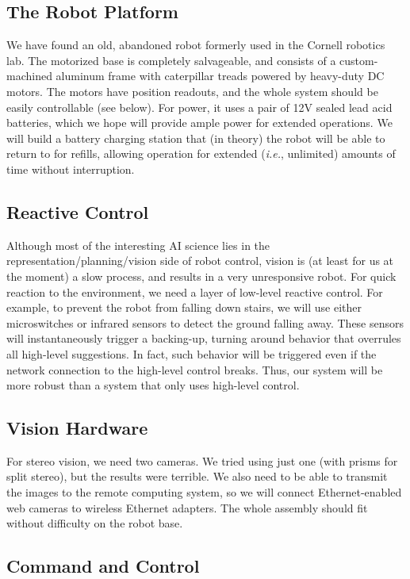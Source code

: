 \documentclass[12pt]{article}
\begin{document}
\subsection{The Robot Platform}

We have found an old, abandoned robot formerly used in the Cornell robotics
lab. The motorized base is completely salvageable, and consists of a custom-machined
aluminum frame with caterpillar treads powered by heavy-duty DC motors. The
motors have position readouts, and the whole system should be easily controllable
(see below). For power, it uses a pair of 12V sealed lead acid batteries, which
we hope will provide ample power for extended operations. We will build a battery
charging station that (in theory) the robot will be able to return to for refills,
allowing operation for extended ({\it i.e.}, unlimited) amounts of time without interruption.


\subsection{Reactive Control}

Although most of the interesting AI science lies in the representation/planning/vision
side of robot control, vision is (at least for us at the moment) a slow process,
and results in a very unresponsive robot. For quick reaction to the environment,
we need a layer of low-level reactive control. For example, to prevent the robot from
falling down stairs, we will use either microswitches or infrared sensors to
detect the ground falling away.  These sensors will instantaneously trigger a backing-up, turning
around behavior that overrules all high-level suggestions.  In fact, such behavior will be triggered even if the network connection to the high-level control breaks.  Thus, our system will be more robust than a system that only uses high-level control.


\subsection{Vision Hardware}

For stereo vision, we need two cameras. We tried using just one (with prisms for split stereo),
but the results were terrible. We also need to be able to transmit the images
to the remote computing system, so we will connect Ethernet-enabled web
cameras to wireless Ethernet adapters. The whole assembly should fit without
difficulty on the robot base.


\subsection{Command and Control}
\end{document}
